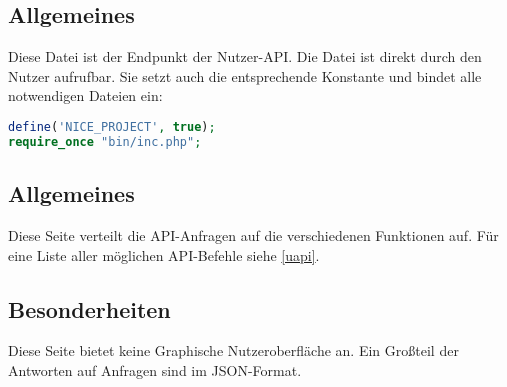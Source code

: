\subsection{Allgemeines} Diese Datei ist der Endpunkt der Nutzer-API.
Die Datei ist direkt durch den Nutzer aufrufbar. Sie setzt auch die entsprechende Konstante und bindet alle notwendigen Dateien ein:
\begin{lstlisting}[language=php]
define('NICE_PROJECT', true);
require_once "bin/inc.php";
\end{lstlisting}
\subsection{Allgemeines}
Diese Seite verteilt die API-Anfragen auf die verschiedenen Funktionen auf. Für eine Liste aller möglichen API-Befehle siehe \autoref{uapi}.
\subsection{Besonderheiten}
Diese Seite bietet keine Graphische Nutzeroberfläche an. Ein Großteil der Antworten auf Anfragen sind im JSON-Format.
